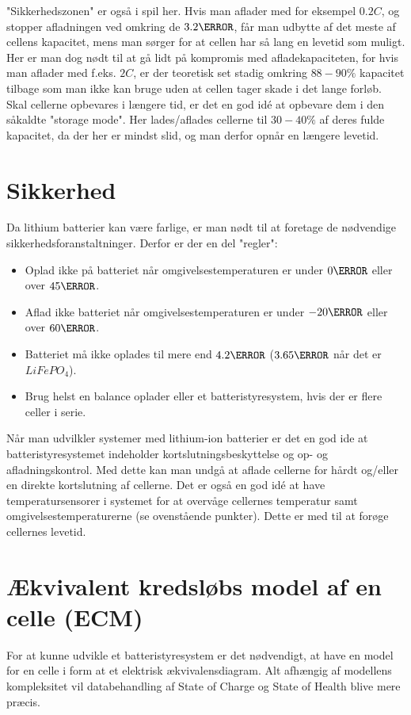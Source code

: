 "Sikkerhedszonen" \space er også i spil her. Hvis man aflader med for eksempel $0.2C$, og stopper afladningen ved omkring de $3.2\volt$, får man udbytte af det meste af cellens kapacitet, mens man sørger for at cellen har så lang en levetid som muligt. Her er man dog nødt til at gå lidt på kompromis med afladekapaciteten, for hvis man aflader med f.eks. $2C$, er der teoretisk set stadig omkring $88-90\percent$ kapacitet tilbage som man ikke kan bruge uden at cellen tager skade i det lange forløb. \\

Skal cellerne opbevares i længere tid, er det en god idé at opbevare dem i den såkaldte "storage mode". Her lades/aflades cellerne til $30-40\percent$ af deres fulde kapacitet, da der her er mindst slid, og man derfor opnår en længere levetid. 

\section{Sikkerhed}
Da lithium batterier kan være farlige, er man nødt til at foretage de nødvendige sikkerhedsforanstaltninger. Derfor er der en del "regler":

\begin{itemize}[noitemsep]
\item Oplad ikke på batteriet når omgivelsestemperaturen er under $0\degreeCelsius$ eller over $45\degreeCelsius$. 
\item Aflad ikke batteriet når omgivelsestemperaturen er under $-20\degreeCelsius$ eller over $60\degreeCelsius$.
\item Batteriet må ikke oplades til mere end $4.2\volt$ ($3.65\volt$ når det er $LiFePO_4$).
\item Brug helst en balance oplader eller et batteristyresystem, hvis der er flere celler i serie.
\end{itemize}

Når man udvilkler systemer med lithium-ion batterier er det en god ide at batteristyresystemet indeholder kortslutningsbeskyttelse og op- og afladningskontrol. Med dette kan man undgå at aflade cellerne for hårdt og/eller en direkte kortslutning af cellerne. Det er også en god idé at have temperatursensorer i systemet for at overvåge cellernes temperatur samt omgivelsestemperaturerne (se ovenstående punkter). Dette er med til at forøge cellernes levetid. 

\section{Ækvivalent kredsløbs model af en celle (ECM)}
For at kunne udvikle et batteristyresystem er det nødvendigt, at have en model for en celle i form at et elektrisk ækvivalensdiagram. Alt afhængig af modellens kompleksitet vil databehandling af State of Charge og State of Health blive mere præcis. \\

